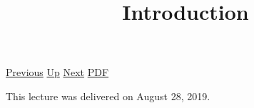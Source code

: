 \documentclass[12pt,a4paper]{report}
\begin{document}
 \href{doc/phil/People/Brandom/OnSellars/2019/InferentialismandNormativity.html}{Previous} 
 \href{doc/phil/People/Brandom/OnSellars/2019.html}{Up} 
 \href{doc/phil/People/Brandom/OnSellars/2019/NominalismI.html}{Next} 
 \href{doc/phil/People/Brandom/OnSellars/2019/Introduction.pdf}{PDF} 
\title{Introduction}

\tableofcontents
This lecture was delivered on August 28, 2019.
\end{document}

